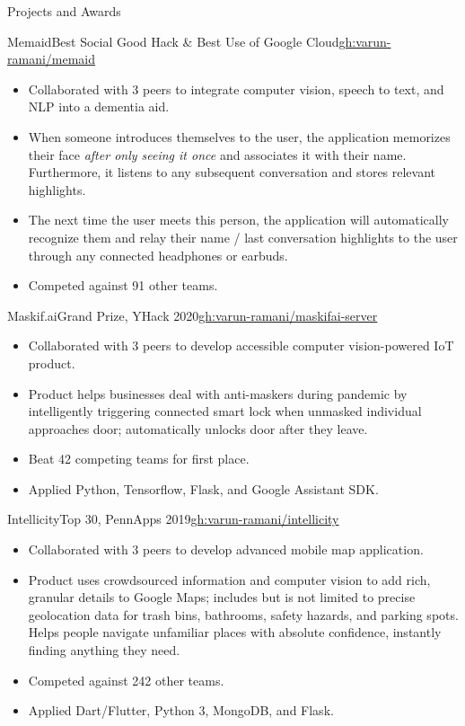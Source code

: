\documentclass[]{mcdowellcv}
\begin{document}
	\begin{cvsection}{Projects and Awards}
		\begin{cvsubsection}{Memaid}{Best Social Good Hack \& Best Use of Google Cloud}{\href{https://github.com/varun-ramani/memaid}{gh:varun-ramani/memaid}}
			\vspace{0.8em}
			\begin{itemize}
				\item Collaborated with 3 peers to integrate computer vision, speech to text, and NLP into a dementia aid.
				\item When someone introduces themselves to the user, the application memorizes their face \emph{after
				      only seeing it once} and associates it with their name. Furthermore, it listens to any subsequent
				      conversation and stores relevant highlights. 
				\item The next time the user meets this person, the application will automatically recognize them and
				      relay their name / last conversation highlights to the user through any connected headphones or earbuds.
				\item Competed against 91 other teams.
			\end{itemize}
		\end{cvsubsection}
		\begin{cvsubsection}{Maskif.ai}{Grand Prize, YHack 2020}{\href{https://github.com/varun-ramani/maskifai-server}{gh:varun-ramani/maskifai-server}}
			\begin{itemize}
				\item Collaborated with 3 peers to develop accessible computer vision-powered IoT product.
				\item Product helps businesses deal with anti-maskers during pandemic by intelligently 
				triggering connected smart lock when unmasked individual approaches door; 
				automatically unlocks door after they leave.
				\item Beat 42 competing teams for first place.
				\item Applied Python, Tensorflow, Flask, and Google Assistant SDK. 
			\end{itemize}
		\end{cvsubsection}
        \begin{cvsubsection}{Intellicity}{Top 30, PennApps 2019}{\href{https://github.com/varun-ramani/intellicity}{gh:varun-ramani/intellicity}}
			\begin{itemize}
				\item Collaborated with 3 peers to develop advanced mobile map application.
				\item Product uses crowdsourced information and computer vision to add rich, granular details
				to Google Maps; includes but is not limited to precise geolocation data for trash bins, bathrooms, 
				safety hazards, and parking spots. Helps people navigate unfamiliar
				places with absolute confidence, instantly finding anything they need. 
				\item Competed against 242 other teams.
				\item Applied Dart/Flutter, Python 3, MongoDB, and Flask.
			\end{itemize}
		\end{cvsubsection}
	\end{cvsection}
\end{document}
